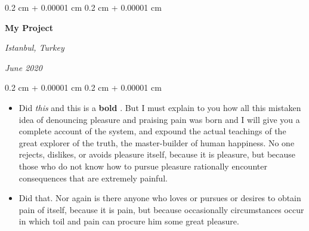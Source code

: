 \documentclass[10pt, letterpaper]{article}
\newenvironment{highlights}{
    \begin{itemize}[
        topsep=0.10 cm,
        parsep=0.10 cm,
        partopsep=0pt,
        itemsep=0pt,
        leftmargin=0.4 cm + 10pt
    ]
}{
    \end{itemize}
} %
\newenvironment{onecolentry}{
    \begin{adjustwidth}{
        0.2 cm + 0.00001 cm
    }{
        0.2 cm + 0.00001 cm
    }
}{
    \end{adjustwidth}
} %
\newenvironment{twocolentry}[2][]{
    \onecolentry
    \def\secondColumn{#2}
    \setcolumnwidth{\fill, 4.5 cm}
    \begin{paracol}{2}
}{
    \switchcolumn \raggedleft \secondColumn
    \end{paracol}
    \endonecolentry
} %
\let\hrefWithoutArrow\href
\renewcommand{\href}[2]{\hrefWithoutArrow{#1}{\ifthenelse{\equal{#2}{}}{ }{#2 }\raisebox{.15ex}{\footnotesize \faExternalLink*}}}
\begin{document}
        \begin{twocolentry}{
        \textit{Istanbul, Turkey}    
            
        \textit{June 2020}}
            \textbf{My Project}
        \end{twocolentry}
        \vspace{0.10 cm}
        \begin{onecolentry}
            \begin{highlights}
                \item Did \textit{this} and this is a \textbf{bold} \href{https://example.com}{link}. But I must explain to you how all this mistaken idea of denouncing pleasure and praising pain was born and I will give you a complete account of the system, and expound the actual teachings of the great explorer of the truth, the master-builder of human happiness. No one rejects, dislikes, or avoids pleasure itself, because it is pleasure, but because those who do not know how to pursue pleasure rationally encounter consequences that are extremely painful.
                \item Did that. Nor again is there anyone who loves or pursues or desires to obtain pain of itself, because it is pain, but because occasionally circumstances occur in which toil and pain can procure him some great pleasure.
            \end{highlights}
        \end{onecolentry}


        \vspace{0.2 cm}
\end{document}
